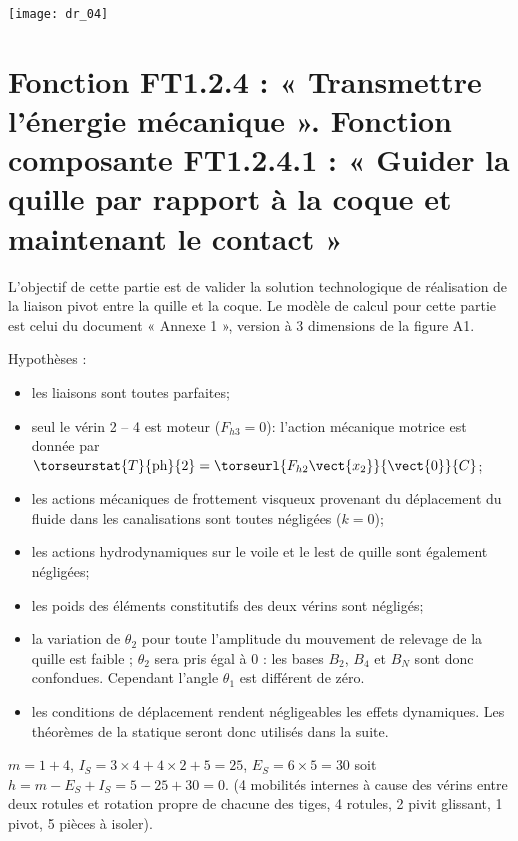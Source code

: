 \begin{center}
\texttt{[image: dr\_04]}
\end{center}

\fi

\section{Fonction FT1.2.4 : « Transmettre l'énergie mécanique ». Fonction composante FT1.2.4.1 : « Guider la quille par rapport à la coque et maintenant le contact »}
\ifprof
\else
L’objectif de cette partie est de valider la solution technologique de réalisation de la liaison pivot entre la quille et la coque. 
Le modèle de calcul pour cette partie est celui du document « Annexe 1 », version à 3 dimensions de la figure A1.%

Hypothèses :
\begin{itemize}
\item les liaisons sont toutes parfaites;
\item seul le vérin 2 -- 4 est moteur ($F_{h3}=0$): l’action mécanique motrice est donnée par $\torseurstat{T}{\text{ph}}{2} = \torseurl{F_{h2}\vect{x_2}}{\vect{0}}{C}$;
\item les actions mécaniques de frottement visqueux provenant du déplacement du fluide dans les canalisations sont toutes négligées ($k=0$);
\item les actions hydrodynamiques sur le voile et le lest de quille sont également négligées;
\item les poids des éléments constitutifs des deux vérins sont négligés;
\item la variation de $\theta_2$ pour toute l’amplitude du mouvement de relevage de la quille est faible ; $\theta_2$ sera pris égal à 0 : les bases $B_2$,  $B_4$ et $B_N$ sont donc confondues. Cependant l’angle $\theta_1$ est différent de zéro.
\item les conditions de déplacement rendent négligeables les effets dynamiques. Les théorèmes de la statique seront donc utilisés dans la suite.
\end{itemize}

\fi

\ifprof
\begin{corrige}
$m = 1 + 4$, $I_S = 3\times 4 + 4 \times 2 + 5 = 25$, $E_S = 6\times 5 = 30$ soit $h = m - E_S + I_S = 5 -25+30=0$.
(4 mobilités internes à cause des vérins entre deux rotules et rotation propre de chacune des tiges, 4 rotules, 2 pivit glissant, 1 pivot, 5 pièces à isoler).
\end{corrige}
\else
\fi


